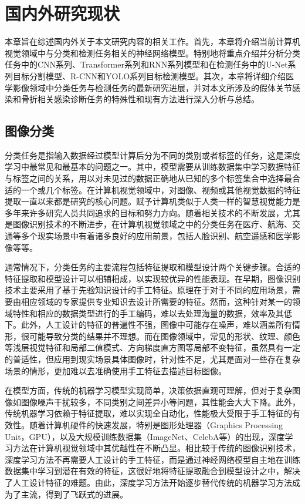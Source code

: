 \chapter{国内外研究现状}\label{chap:related_work}

本章旨在综述国内外关于本文研究内容的相关工作。首先，本章将介绍当前计算机视觉领域中与分类和检测任务相关的神经网络模型。特别地将重点介绍并分析分类任务中的CNN系列、Transformer系列和RNN系列模型和在检测任务中的U-Net系列目标分割模型、R-CNN和YOLO系列目标检测模型。其次，本章将详细介绍医学影像领域中分类任务与检测任务的最新研究进展，并对本文所涉及的假体关节感染和骨折相关感染诊断任务的特殊性和现有方法进行深入分析与总结。

\section{图像分类}

分类任务是指输入数据经过模型计算后分为不同的类别或者标签的任务，这是深度学习中最常见和最基本的问题之一。其中，模型需要从训练数据集中学习数据特征与标签之间的关系，用以对未见过的数据正确地从已知的多个标签集合中选择最合适的一个或几个标签。在计算机视觉领域中，对图像、视频或其他视觉数据的特征提取一直以来都是研究的核心问题。赋予计算机类似于人类一样的智慧视觉能力是多年来许多研究人员共同追求的目标和努力方向。随着相关技术的不断发展，尤其是图像识别技术的不断进步，在计算机视觉领域之中的分类任务在医疗、航海、交通等多个现实场景中有着诸多良好的应用前景，包括人脸识别、航空遥感和医学影像等等。

通常情况下，分类任务的主要流程包括特征提取和模型设计两个关键步骤。合适的特征提取和模型设计可以相辅相成，以实现较优异的性能表现。在早期，图像识别技术\cite{fu1976pattern}主要采用了基于先验知识设计的手工特征。原理在于对于不同的应用场景，需要由相应领域的专家提供专业知识去设计所需要的特征。然而，这种针对某一的领域特性和相应的数据类型进行的手工编码，难以去处理海量的数据，效率及其低下\cite{季长清2022基于卷积神经网络的图像分类算法综述}。此外，人工设计的特征的普遍性不强，图像中可能存在噪声，难以涵盖所有情形，很可能导致分类的结果并不理想。而在图像领域中，常见的形状、纹理、颜色等浅层视觉特征和局部二值模式、方向梯度直方图等局部不变特征，虽然具有一定的普适性，但应用到现实场景具体图像时，针对性不足，尤其是面对一些存在复杂场景的情形，更加难以去准确使用手工特征去描述目标图像\cite{杨真真2018基于卷积神经网络的图像分类算法综述}。

在模型方面，传统的机器学习模型实现简单，决策依据直观可理解，但对于复杂图像如图像噪声干扰较多，不同类别之间差异小等问题，其性能会大大下降。此外，传统机器学习依赖于特征提取，难以实现全自动化，性能极大受限于手工特征的有效性。随着计算机硬件的快速发展，特别是图形处理器（Graphics Processing Unit，GPU），以及大规模训练数据集（ImageNet\cite{deng2009imagenet}、CelebA\cite{liu2018large}等）的出现，深度学习方法在计算机视觉领域中其优越性在不断凸显。相比较于传统的图像识别技术，深度学习方法不再需要人工设计的手工特征，而是通过神经网络模型自主地在训练数据集中学习到潜在有效的特征，这很好地将特征提取融合到模型设计之中，解决了人工设计特征的难题。由此，深度学习方法开始逐步替代传统的机器学习方法成为了主流，得到了飞跃式的进展。

